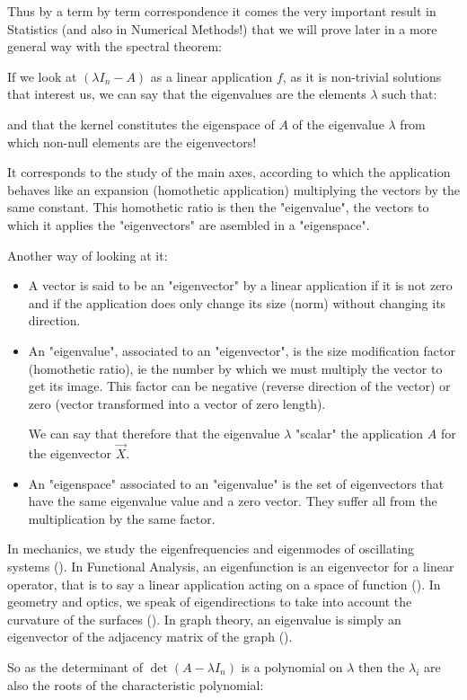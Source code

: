 	Thus by a term by term correspondence it comes the very important result in Statistics (and also in Numerical Methods!) that we will prove later in a more general way with the spectral theorem:
	
	If we look at $(\lambda I_n-A)$ as a linear application $f$, as it is non-trivial solutions that interest us, we can say that the eigenvalues are the elements $\lambda$ such that:
	
	and that the kernel constitutes the eigenspace  of $A$ of the eigenvalue $\lambda$ from which non-null elements are the eigenvectors!
	
	It corresponds to the study of the main axes, according to which the application behaves like an expansion (homothetic application) multiplying the vectors by the same constant. This homothetic ratio is then the "eigenvalue", the vectors to which it applies the "eigenvectors" are asembled in a "eigenspace".
	
	Another way of looking at it:
	\begin{itemize}
		\item A vector is said to be an "eigenvector" by a linear application if it is not zero and if the application does only change its size (norm) without changing its direction.

		\item An "eigenvalue", associated to an "eigenvector", is the size modification factor (homothetic ratio), ie the number by which we must multiply the vector to get its image. This factor can be negative (reverse direction of the vector) or zero (vector transformed into a vector of zero length).
		
		We can say that therefore that the eigenvalue $\lambda$ "scalar" the application $A$ for the eigenvector $\vec{X}$.

		\item An "eigenspace" associated to an "eigenvalue" is the set of eigenvectors that have the same eigenvalue value and a zero vector. They suffer all from the multiplication by the same factor.
	\end{itemize}
	\begin{tcolorbox}[title=Remark,colframe=black,arc=10pt]
	In mechanics, we study the eigenfrequencies and eigenmodes of oscillating systems (). In Functional Analysis, an eigenfunction is an eigenvector for a linear operator, that is to say a linear application acting on a space of function (). In geometry and optics, we speak of eigendirections to take into account the curvature of the surfaces (). In graph theory, an eigenvalue is simply an eigenvector of the adjacency matrix of the graph ().
	\end{tcolorbox}
	So as the determinant of $\det(A-\lambda I_n)$ is a polynomial on $\lambda$ then the $\lambda_i$ are also the roots of the characteristic polynomial:
	
